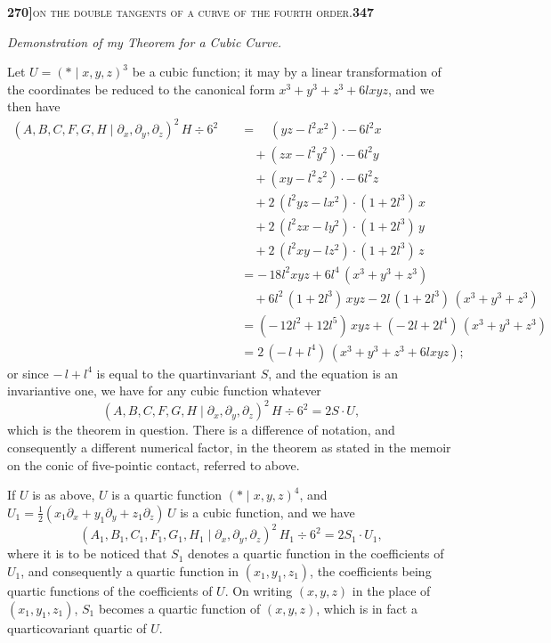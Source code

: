 \documentclass[11pt]{article}
\newcommand{\Cdel}{\mid}
\begin{document}
\newpage
\setcounter{page}{347}

\noindent\textbf{270]}\hfill\textsc{on the double tangents of a curve of the fourth order.}\hfill\textbf{347}

\begin{center}\textit{Demonstration of my Theorem for a Cubic Curve.}\end{center}

\medskip

\noindent Let $U = (*\Cdel x, y, z)^3$ be a cubic function; it may by a linear transformation of the coordinates be reduced to the canonical form $x^3 + y^3 + z^3 + 6 l x y z$, and we then have
\[
\begin{aligned}
(A, B, C, F, G, H\Cdel\partial_x, \partial_y, \partial_z)^2\,H \div 6^2\quad &= \quad(y z - l^2 x^2)\cdot -\,6 l^2 x\\
&\quad{} + (z x - l^2 y^2)\cdot -\,6 l^2 y\\
&\quad{} + (x y - l^2 z^2)\cdot -\,6 l^2 z\\
&\quad{} + 2\,(l^2 y z - l x^2)\cdot(1 + 2 l^3)\,x\\
&\quad{} + 2\,(l^2 z x - l y^2)\cdot(1 + 2 l^3)\,y\\
&\quad{} + 2\,(l^2 x y - l z^2)\cdot(1 + 2 l^3)\,z\\
&= -\,18 l^2 x y z + 6 l^4\,(x^3 + y^3 + z^3)\\
&\quad{} + 6 l^2\,(1 + 2 l^3)\,x y z - 2 l\,(1 + 2 l^3)\,(x^3 + y^3 + z^3)\\
&= (-\,12 l^2 + 12 l^5)\,x y z + (-\,2 l + 2 l^4)\,(x^3 + y^3 + z^3)\\
&= 2\,(-\,l + l^4)\,(x^3 + y^3 + z^3 + 6 l x y z);
\end{aligned}
\]
or since $-\,l + l^4$ is equal to the quartinvariant $S$, and the equation is an invariantive one, we have for any cubic function whatever
\[
   (A, B, C, F, G, H\Cdel\partial_x, \partial_y, \partial_z)^2\,H \div 6^2 = 2 S\cdot U,
\]
which is the theorem in question. There is a difference of notation, and consequently a different numerical factor, in the theorem as stated in the memoir on the conic of five-pointic contact, referred to above.

\medskip

\noindent If $U$ is as above, $U$ is a quartic function $(*\Cdel x, y, z)^4$, and $U_1 = \tfrac{1}{2}(x_1\partial_x + y_1\partial_y + z_1\partial_z)\,U$ is a cubic function, and we have
\[
   (A_1, B_1, C_1, F_1, G_1, H_1\Cdel\partial_x, \partial_y, \partial_z)^2\,H_1 \div 6^2 = 2 S_1\cdot U_1,
\]
where it is to be noticed that $S_1$ denotes a quartic function in the coefficients of $U_1$, and consequently a quartic function in $(x_1, y_1, z_1)$, the coefficients being quartic functions of the coefficients of $U$. On writing $(x, y, z)$ in the place of $(x_1, y_1, z_1)$, $S_1$ becomes a quartic function of $(x, y, z)$, which is in fact a quarticovariant quartic of $U$.
\end{document}
